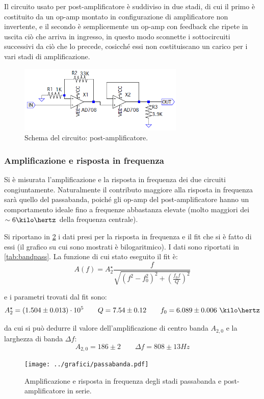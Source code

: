 \documentclass[a4paper,10pt]{article}
\begin{document}
Il circuito usato per post-amplificatore è suddiviso in due stadi, di cui il primo è costituito da un op-amp montato in configurazione di amplificatore non invertente, e il secondo è semplicemente un op-amp con feedback che ripete in uscita ciò che arriva in ingresso, in questo modo sconnette i sottocircuiti successivi da ciò che lo precede, cosicché essi non costituiscano un carico per i vari stadi di amplificazione. 

\begin{figure}[H]
	\vspace{-10pt}
	\centering
	\includegraphics[width=0.7\textwidth]{../grafici/PostAmp.png}
	\vspace{-12pt}
	\caption{Schema del circuito: post-amplificatore.}
	\label{fig:postamp}
	\vspace{-6pt}
\end{figure}

\subsubsection*{Amplificazione e risposta in frequenza}

Si è misurata l'amplificazione e la risposta in frequenza dei due circuiti congiuntamente. Naturalmente il contributo maggiore alla risposta in frequenza sarà quello del passabanda, poiché gli op-amp del post-amplificatore hanno un comportamento ideale fino a frequenze abbastanza elevate (molto maggiori dei $\sim 6 \kilo\hertz $ della frequenza centrale).

Si riportano in \cref{fig:FITbandpass} i dati presi per la risposta in frequenza e il fit che si è fatto di essi (il grafico su cui sono mostrati è bilogaritmico). I dati sono riportati in \cref{tab:bandpass}.
La funzione di cui stato eseguito il fit è:
\[ A(f) = A_2^\star \frac{f}{\sqrt{(f^2-f_0^2)^2 + \left(\frac{f_0 f}{Q}\right)^2}} \]

e i parametri trovati dal fit sono:
\[ A_2^\star=(1.504 \pm 0.013)\cdot10^5 \qquad Q=7.54 \pm 0.12 \qquad f_0=6.089 \pm 0.006~\kilo\hertz  \]


da cui si può dedurre il valore dell'amplificazione di centro banda $ A_{2,0} $ e la larghezza di banda $ \Delta f $:
\[ A_{2,0} = 186 \pm 2	\qquad	\Delta f = 808 \pm 13 Hz \]
\vspace*{-30pt}
\begin{figure}[H]
	\centering
	\texttt{[image: ../grafici/passabanda.pdf]}
	\vspace*{-5pt}
	\caption{Amplificazione e risposta in frequenza degli stadi passabanda e post-amplificatore in serie.}
	\label{fig:FITbandpass}
\end{figure}
\end{document}
